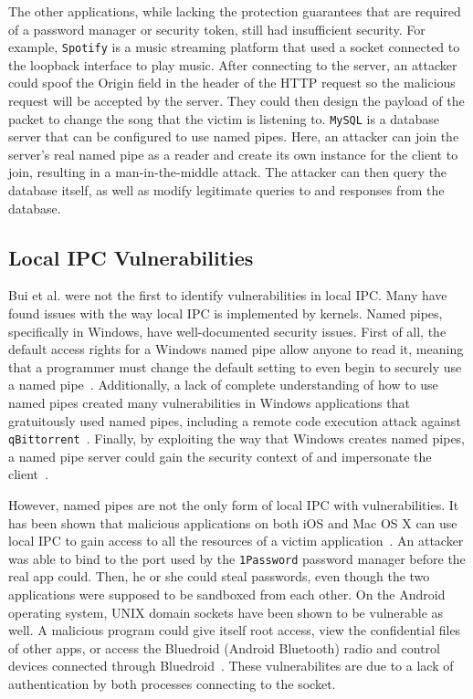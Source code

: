 The other applications, while lacking the protection guarantees that are required of a password manager or security token, still had insufficient security.  For example, \texttt{Spotify} is a music streaming platform that used a socket connected to the loopback interface to play music.  After connecting to the server, an attacker could spoof the Origin field in the header of the HTTP request so the malicious request will be accepted by the server.  They could then design the payload of the packet to change the song that the victim is listening to.  \texttt{MySQL} is a database server that can be configured to use named pipes.  Here, an attacker can join the server's real named pipe as a reader and create its own instance for the client to join, resulting in a man-in-the-middle attack.  The attacker can then query the database itself, as well as modify legitimate queries to and responses from the database.

\subsection{Local IPC Vulnerabilities}
\label{sec:localIPCVulnerabilities}
Bui et al. were not the first to identify vulnerabilities in local IPC.  Many have found issues with the way local IPC is implemented by kernels.  Named pipes, specifically in Windows, have well-documented security issues.  First of all, the default access rights for a Windows named pipe allow anyone to read it, meaning that a programmer must change the default setting to even begin to securely use a named pipe~\cite{microsoft_2018}.  Additionally, a lack of complete understanding of how to use named pipes created many vulnerabilities in Windows applications that gratuitously used named pipes, including a remote code execution attack against \texttt{qBittorrent}~\cite{cohen_2019}.  Finally, by exploiting the way that Windows creates named pipes, a named pipe server could gain the security context of and impersonate the client~\cite{watts2002discovering}.

However, named pipes are not the only form of local IPC with vulnerabilities.  It has been shown that malicious applications on both iOS and Mac OS X can use local IPC to gain access to all the resources of a victim application~\cite{Xing_2015_CAI_2810103_2813609}.  An attacker was able to bind to the port used by the \texttt{1Password} password manager before the real app could.  Then, he or she could steal passwords, even though the two applications were supposed to be sandboxed from each other.  On the Android operating system, UNIX domain sockets have been shown to be vulnerable as well.  A malicious program could give itself root access, view the confidential files of other apps, or access the Bluedroid (Android Bluetooth) radio and control devices connected through Bluedroid~\cite{Shao_2016_MAU_2976749_2978297}.  These vulnerabilites are due to a lack of authentication by both processes connecting to the socket.
